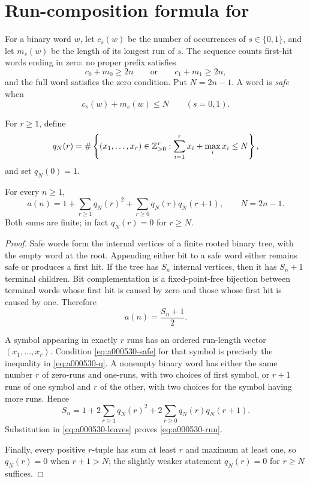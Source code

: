 \section{Run-composition formula for \texorpdfstring{}{A000530}}
\label{sec:a000530}

For a binary word \(w\), let \(c_s(w)\) be the number of occurrences of
\(s\in\{0,1\}\), and let \(m_s(w)\) be the length of its longest run of
\(s\).  The sequence  counts first-hit words ending in zero: no
proper prefix satisfies
\[
 c_0+m_0\ge 2n\qquad\text{or}\qquad c_1+m_1\ge2n,
\]
and the full word satisfies the zero condition.  Put \(N=2n-1\).  A word is
\emph{safe} when
\begin{equation}
 c_s(w)+m_s(w)\le N\qquad(s=0,1).
 \label{eq:a000530-safe}
\end{equation}

For \(r\ge1\), define
\begin{equation}
 q_N(r)=\#\left\{(x_1,\ldots,x_r)\in\mathbb{Z}_{>0}^r:
       \sum_{i=1}^r x_i+\max_i x_i\le N\right\},
 \label{eq:a000530-q}
\end{equation}
and set \(q_N(0)=1\).

\begin{theorem}
\label{thm:a000530-run}
For every \(n\ge1\),
\begin{equation}
 \boxed{
 a(n)=1+\sum_{r\ge1}q_N(r)^2+
          \sum_{r\ge0}q_N(r)q_N(r+1),\qquad N=2n-1.}
 \label{eq:a000530-run}
\end{equation}
Both sums are finite; in fact \(q_N(r)=0\) for \(r\ge N\).
\end{theorem}

\begin{proof}
Safe words form the internal vertices of a finite rooted binary tree, with the
empty word at the root.  Appending either bit to a safe word either remains
safe or produces a first hit.  If the tree has \(S_n\) internal vertices, then
it has \(S_n+1\) terminal children.  Bit complementation is a fixed-point-free
bijection between terminal words whose first hit is caused by zero and those
whose first hit is caused by one.  Therefore
\begin{equation}
 a(n)=\frac{S_n+1}{2}.
 \label{eq:a000530-leaves}
\end{equation}

A symbol appearing in exactly \(r\) runs has an ordered run-length vector
\((x_1,\ldots,x_r)\).  Condition \cref{eq:a000530-safe} for that symbol is
precisely the inequality in \cref{eq:a000530-q}.  A nonempty binary word has
either the same number \(r\) of zero-runs and one-runs, with two choices of
first symbol, or \(r+1\) runs of one symbol and \(r\) of the other, with two
choices for the symbol having more runs.  Hence
\[
 S_n=1+2\sum_{r\ge1}q_N(r)^2+
        2\sum_{r\ge0}q_N(r)q_N(r+1).
\]
Substitution in \cref{eq:a000530-leaves} proves
\cref{eq:a000530-run}.

Finally, every positive \(r\)-tuple has sum at least \(r\) and maximum at
least one, so \(q_N(r)=0\) when \(r+1>N\); the slightly weaker statement
\(q_N(r)=0\) for \(r\ge N\) suffices.
\end{proof}

